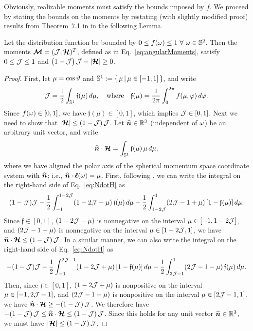 Obviously, realizable moments must satisfy the bounds imposed by $f$.  
We proceed by stating the bounds on the moments by restating (with slightly modified proof) results from Theorem~7.1 in \cite{banachLarecki_2017} in the following Lemma.  
\begin{lemma}
  Let the distribution function be bounded by $0\le f(\omega) \le1~\forall~\omega\in\mathbb{S}^{2}$.  
  Then the moments $\boldsymbol{\mathcal{M}}=(\mathcal{J},\boldsymbol{\mathcal{H}})^{T}$, defined as in Eq.~\eqref{eq:angularMoments}, satisfy $0\le\mathcal{J}\le1$ and $\big(1-\mathcal{J}\big)\,\mathcal{J}-|\boldsymbol{\mathcal{H}}|\ge0$. 
  \label{lem:MomentRealizable} 
\end{lemma}
\begin{proof}
  First, let $\mu=\cos\vartheta$ and $\mathbb{S}^{1}:=\{\,\mu\,|\,\mu\in[-1,1]\,\}$, and write
  \begin{equation}
    \mathcal{J}=\frac{1}{2}\int_{\mathbb{S}^{1}}\mathfrak{f}(\mu)\,d\mu,
    \quad\text{where}\quad
    \mathfrak{f}(\mu)=\frac{1}{2\pi}\int_{0}^{2\pi}f(\mu,\varphi)\,d\varphi.  
  \end{equation}  
  Since $f(\omega)\in[0,1]$, we have $\mathfrak{f}(\mu)\in[0,1]$, which implies $\mathcal{J}\in[0,1]$.  
  Next we need to show that $|\boldsymbol{\mathcal{H}}|\le(1-\mathcal{J})\,\mathcal{J}$.  
  Let $\widehat{\boldsymbol{n}}\in\mathbb{R}^{3}$ (independent of $\omega$) be an arbitrary unit vector, and write
  \begin{equation}
    \widehat{\boldsymbol{n}}\cdot\boldsymbol{\mathcal{H}}
    =\int_{\mathbb{S}^{1}}\mathfrak{f}(\mu)\,\mu\,d\mu,
    \label{eq:NdotH}
  \end{equation}
  where we have aligned the polar axis of the spherical momentum space coordinate system with $\widehat{\boldsymbol{n}}$; i.e., $\widehat{\boldsymbol{n}}\cdot\boldsymbol{\ell}(\omega)=\mu$.  
  First, following \cite{banachLarecki_2017}, we can write the integral on the right-hand side of Eq.~\eqref{eq:NdotH} as
  \begin{equation*}
    (1-\mathcal{J})\mathcal{J} - \frac{1}{2}\int_{-1}^{1-2\mathcal{J}}(1-2\mathcal{J}-\mu)\,\mathfrak{f}(\mu)\,d\mu
    -\frac{1}{2}\int_{1-2\mathcal{J}}^{1}(2\mathcal{J}-1+\mu)\,[1-\mathfrak{f}(\mu)]\,d\mu.  
  \end{equation*}
  Since $\mathfrak{f}\in[0,1]$, $(1-2\mathcal{J}-\mu)$ is nonnegative on the interval $\mu\in[-1,1-2\mathcal{J}]$, and $(2\mathcal{J}-1+\mu)$ is nonnegative on the interval $\mu\in[1-2\mathcal{J},1]$, we have $\widehat{\boldsymbol{n}}\cdot\boldsymbol{\mathcal{H}}\le(1-\mathcal{J})\,\mathcal{J}$.  
  In a similar manner, we can also write the integral on the right-hand side of Eq.~\eqref{eq:NdotH} as
  \begin{equation*}
    -(1-\mathcal{J})\mathcal{J}-\frac{1}{2}\int_{-1}^{2\mathcal{J}-1}(1-2\mathcal{J}+\mu)\,[1-\mathfrak{f}(\mu)]\,d\mu
    -\frac{1}{2}\int_{2\mathcal{J}-1}^{1}(2\mathcal{J}-1-\mu)\,\mathfrak{f}(\mu)\,d\mu.  
  \end{equation*}
  Then, since $\mathfrak{f}\in[0,1]$, $(1-2\mathcal{J}+\mu)$ is nonpositive on the interval $\mu\in[-1,2\mathcal{J}-1]$, and $(2\mathcal{J}-1-\mu)$ is nonpositive on the interval $\mu\in[2\mathcal{J}-1,1]$, we have $\widehat{\boldsymbol{n}}\cdot\boldsymbol{\mathcal{H}}\ge-(1-\mathcal{J})\,\mathcal{J}$.  
  We therefore have $-(1-\mathcal{J})\,\mathcal{J}\le\widehat{\boldsymbol{n}}\cdot\boldsymbol{\mathcal{H}}\le(1-\mathcal{J})\,\mathcal{J}$.  
  Since this holds for any unit vector $\widehat{\boldsymbol{n}}\in\mathbb{R}^{3}$, we must have $|\boldsymbol{\mathcal{H}}|\le(1-\mathcal{J})\,\mathcal{J}$.  
\end{proof}

